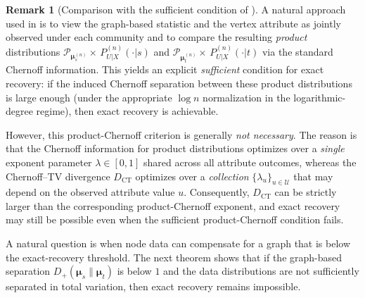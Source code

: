 \documentclass[11pt]{article}
\theoremstyle{plain}
\theoremstyle{definition}
\newtheorem*{remark}{Remark}
\begin{document}
\begin{remark}[Comparison with the sufficient condition of \cite{asadi2017compressing}]\label{rem:CT_vs_productChernoff}
A natural approach used in \citep{asadi2017compressing} is to view the graph-based statistic and the vertex attribute as jointly observed under each community and to compare the resulting \emph{product} distributions $\mathcal{P}_{\bm{\mu}_s^{(n)}}\times\,P^{(n)}_{U|X}(\cdot|s)$
and $\mathcal{P}_{\bm{\mu}_t^{(n)}}\times\,P^{(n)}_{U|X}(\cdot|t)$
via the standard Chernoff information. This yields an explicit \emph{sufficient} condition for exact recovery: if the induced Chernoff separation between these product distributions is large enough (under the appropriate $\log n$ normalization in the logarithmic-degree regime), then exact recovery is achievable.

However, this product-Chernoff criterion is generally \emph{not necessary}.
The reason is that the Chernoff information for product distributions optimizes over a \emph{single} exponent parameter $\lambda\in[0,1]$ shared across all attribute outcomes, whereas the Chernoff--TV divergence $D_{\mathrm{CT}}$ optimizes over a \emph{collection} $\{\lambda_u\}_{u\in\mathcal{U}}$ that may depend on the observed attribute value $u$.
Consequently, $D_{\mathrm{CT}}$ can be strictly larger than the corresponding product-Chernoff exponent, and exact recovery may still be possible even when the sufficient product-Chernoff condition fails.
\end{remark}

A natural question is when node data can compensate for a graph that is below the exact-recovery threshold.
The next theorem shows that if the graph-based separation $D_+(\boldsymbol{\mu}_s\|\boldsymbol{\mu}_t)$ is below $1$ and the data distributions are not sufficiently separated in total variation, then exact recovery remains impossible.
\end{document}
